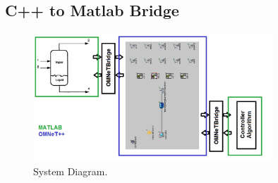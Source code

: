 \subsection{C++ to Matlab Bridge}



\begin{figure}
        \centering
		\includegraphics[width=0.8\textwidth]{figs/system.png}
        \caption{System Diagram.}
        \label{fig:system}        
\end{figure}
